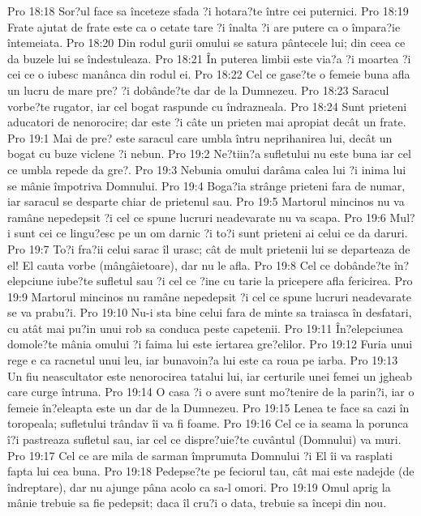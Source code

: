 Pro 18:18  Sor?ul face sa înceteze sfada ?i hotara?te între cei puternici.
Pro 18:19  Frate ajutat de frate este ca o cetate tare ?i înalta ?i are putere ca o împara?ie întemeiata.
Pro 18:20  Din rodul gurii omului se satura pântecele lui; din ceea ce da buzele lui se îndestuleaza.
Pro 18:21  În puterea limbii este via?a ?i moartea ?i cei ce o iubesc manânca din rodul ei.
Pro 18:22  Cel ce gase?te o femeie buna afla un lucru de mare pre? ?i dobânde?te dar de la Dumnezeu.
Pro 18:23  Saracul vorbe?te rugator, iar cel bogat raspunde cu îndrazneala.
Pro 18:24  Sunt prieteni aducatori de nenorocire; dar este ?i câte un prieten mai apropiat decât un frate.
Pro 19:1  Mai de pre? este saracul care umbla întru neprihanirea lui, decât un bogat cu buze viclene ?i nebun.
Pro 19:2  Ne?tiin?a sufletului nu este buna iar cel ce umbla repede da gre?.
Pro 19:3  Nebunia omului darâma calea lui ?i inima lui se mânie împotriva Domnului.
Pro 19:4  Boga?ia strânge prieteni fara de numar, iar saracul se desparte chiar de prietenul sau.
Pro 19:5  Martorul mincinos nu va ramâne nepedepsit ?i cel ce spune lucruri neadevarate nu va scapa.
Pro 19:6  Mul?i sunt cei ce lingu?esc pe un om darnic ?i to?i sunt prieteni ai celui ce da daruri.
Pro 19:7  To?i fra?ii celui sarac îl urasc; cât de mult prietenii lui se departeaza de el! El cauta vorbe (mângâietoare), dar nu le afla.
Pro 19:8  Cel ce dobânde?te în?elepciune iube?te sufletul sau ?i cel ce ?ine cu tarie la pricepere afla fericirea.
Pro 19:9  Martorul mincinos nu ramâne nepedepsit ?i cel ce spune lucruri neadevarate se va prabu?i.
Pro 19:10  Nu-i sta bine celui fara de minte sa traiasca în desfatari, cu atât mai pu?in unui rob sa conduca peste capetenii.
Pro 19:11  În?elepciunea domole?te mânia omului ?i faima lui este iertarea gre?elilor.
Pro 19:12  Furia unui rege e ca racnetul unui leu, iar bunavoin?a lui este ca roua pe iarba.
Pro 19:13  Un fiu neascultator este nenorocirea tatalui lui, iar certurile unei femei un jgheab care curge întruna.
Pro 19:14  O casa ?i o avere sunt mo?tenire de la parin?i, iar o femeie în?eleapta este un dar de la Dumnezeu.
Pro 19:15  Lenea te face sa cazi în toropeala; sufletului trândav îi va fi foame.
Pro 19:16  Cel ce ia seama la porunca î?i pastreaza sufletul sau, iar cel ce dispre?uie?te cuvântul (Domnului) va muri.
Pro 19:17  Cel ce are mila de sarman împrumuta Domnului ?i El îi va rasplati fapta lui cea buna.
Pro 19:18  Pedepse?te pe feciorul tau, cât mai este nadejde (de îndreptare), dar nu ajunge pâna acolo ca sa-l omori.
Pro 19:19  Omul aprig la mânie trebuie sa fie pedepsit; daca îl cru?i o data, trebuie sa începi din nou.
